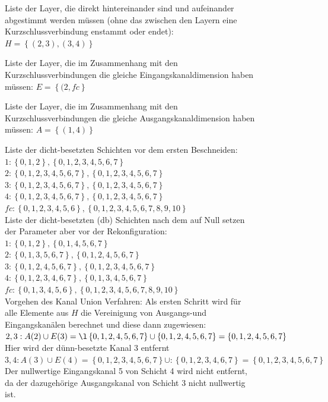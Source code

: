 \begin{figure}[htbp]
{\begin{minipage}[t]{0.65\textwidth}
Liste der Layer, die direkt hintereinander sind und aufeinander abgestimmt werden müssen (ohne das zwischen den Layern eine Kurzschlussverbindung enstammt oder endet): $H=\left\{(2,3),(3,4) \right\}$


Liste der Layer, die im Zusammenhang mit den Kurzschlussverbindungen die gleiche Eingangskanaldimension haben müssen: $E=\left\{(2,fc \right\}$

Liste der Layer, die im Zusammenhang mit den Kurzschlussverbindungen die gleiche Ausgangskanaldimension haben müssen: $A=\left\{(1,4 )\right\}$

Liste der dicht-besetzten Schichten vor dem ersten Beschneiden:\\
$1:\left\{0,1,2\right\},\left\{0,1,2,3,4,5,6,7\right\}$\\ 
$2:\left\{0,1,2,3,4,5,6,7\right\},\left\{0,1,2,3,4,5,6,7\right\}$\\
$3:\left\{0,1,2,3,4,5,6,7\right\},\left\{0,1,2,3,4,5,6,7\right\}$\\
$4:\left\{0,1,2,3,4,5,6,7\right\},\left\{0,1,2,3,4,5,6,7\right\}$\\
$fc:\left\{0,1,2,3,4,5,6\right\},\left\{0,1,2,3,4,5,6,7,8,9,10\right\}$\\

Liste der dicht-besetzten (db) Schichten nach dem auf Null setzen der Parameter aber vor der Rekonfiguration:\\
$1:\left\{0,1,2\right\},\left\{0,1,4,5,6,7\right\}$\\ 
$2:\left\{0,1,3,5,6,7\right\},\left\{0,1,2,4,5,6,7\right\}$\\
$3:\left\{0,1,2,4,5,6,7\right\},\left\{0,1,2,3,4,5,6,7\right\}$\\
$4:\left\{0,1,2,3,4,6,7\right\},\left\{0,1,3,4,5,6,7\right\}$\\
$fc:\left\{0,1,3,4,5,6\right\},\left\{0,1,2,3,4,5,6,7,8,9,10\right\}$\\

Vorgehen des Kanal Union Verfahren:
Als ersten Schritt wird für alle Elemente aus $H$ die Vereinigung von Ausgangs-und Eingangskanälen berechnet und diese dann zugewiesen:\\
$2,3:A(2) \cup E(3)= \l\left\{0,1,2,4,5,6,7\right\} \cup \left\{0,1,2,4,5,6,7\right\} =\left\{0,1,2,4,5,6,7\right\} $\\ Hier wird der dünn-besetzte Kanal 3 entfernt\\
$3,4: A(3) \cup E(4) =
\left\{0,1,2,3,4,5,6,7\right\} \cup :\left\{0,1,2,3,4,6,7\right\} = \left\{0,1,2,3,4,5,6,7\right\}$\\
Der nullwertige Eingangskanal 5 von Schicht 4 wird nicht entfernt, da der dazugehörige Ausgangskanal von Schicht 3 nicht nullwertig ist.


\end{minipage}}
\end{figure}
